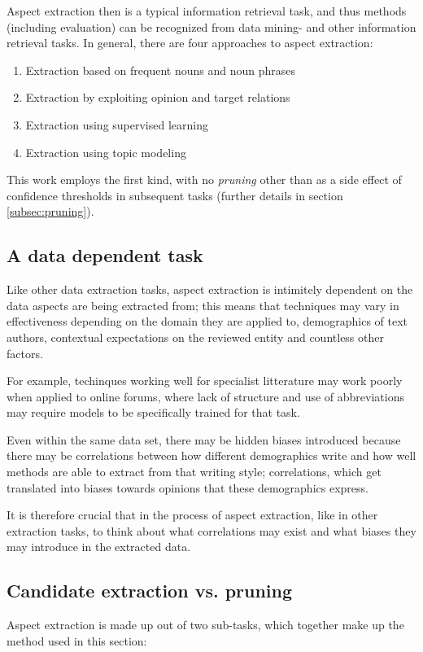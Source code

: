 \documentclass[a4paper,11pt]{kth-mag}
\begin{document}
Aspect extraction then is a typical information retrieval task, and thus methods
(including evaluation) can be recognized from data mining- and other information retrieval tasks.
In general, there are four approaches to aspect extraction\cite[chapter 5.3]{liu2012sentiment}:

\begin{enumerate}
\item Extraction based on frequent nouns and noun phrases
\item Extraction by exploiting opinion and target relations
\item Extraction using supervised learning
\item Extraction using topic modeling
\end{enumerate}
This work employs the first kind, with no \emph{pruning} other than as a side effect of
confidence thresholds in subsequent tasks (further details in section \ref{subsec:pruning}).


\subsection{A data dependent task}
Like other data extraction tasks, aspect extraction is intimitely dependent on the data
aspects are being extracted from; this means that techniques may vary in effectiveness
depending on the domain they are applied to, demographics of text authors, 
contextual expectations on the reviewed entity and countless other factors.

For example, techinques working well for specialist litterature may work poorly when applied
to online forums, where lack of structure and use of abbreviations may require models to be specifically
trained for that task.

Even within the same data set, there may be hidden biases introduced because there may be correlations
between how different demographics write and how well methods are able to extract from that writing style;
correlations, which get translated into biases towards opinions that these demographics express.

It is therefore crucial that in the process of aspect extraction, like in other extraction tasks,
to think about what correlations may exist and what biases they may introduce in the extracted data.


\subsection{Candidate extraction vs. pruning}
Aspect extraction is made up out of two sub-tasks, which together make up the method used in this section:
\end{document}
